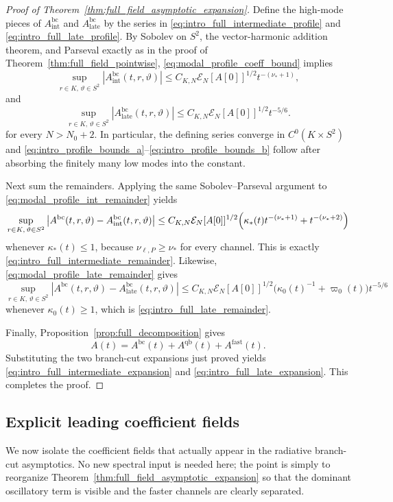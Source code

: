 \documentclass[12pt]{article}
\numberwithin{equation}{section}
\theoremstyle{plain}
\theoremstyle{definition}
\theoremstyle{remark}
\newcommand{\bc}{\mathrm{bc}}
\newcommand{\qb}{\mathrm{qb}}
\newcommand{\fast}{\mathrm{fast}}
\newcommand{\vp}{\varpi}
\newcommand{\kap}{\kappa}
\newcommand{\abs}[1]{\left|#1\right|}
\begin{document}
\begin{proof}[Proof of Theorem~\ref{thm:full_field_asymptotic_expansion}]
Define the high-mode pieces of $A^{\bc}_{\mathrm{int}}$ and $A^{\bc}_{\mathrm{late}}$ by the series in \eqref{eq:intro_full_intermediate_profile} and \eqref{eq:intro_full_late_profile}.  By Sobolev on $S^2$, the vector-harmonic addition theorem, and Parseval exactly as in the proof of Theorem~\ref{thm:full_field_pointwise}, \eqref{eq:modal_profile_coeff_bound} implies
\[
   \sup_{r\in K,\,\vartheta\in S^2}
   \abs{A^{\bc}_{\mathrm{int}}(t,r,\vartheta)}
   \le
   C_{K,N}\mathcal E_N[A[0]]^{1/2}t^{-(\nu_*+1)},
\]
and
\[
   \sup_{r\in K,\,\vartheta\in S^2}
   \abs{A^{\bc}_{\mathrm{late}}(t,r,\vartheta)}
   \le
   C_{K,N}\mathcal E_N[A[0]]^{1/2}t^{-5/6}.
\]
for every $N>N_0+2$.  In particular, the defining series converge in $C^0(K\times S^2)$ and \eqref{eq:intro_profile_bounds_a}--\eqref{eq:intro_profile_bounds_b} follow after absorbing the finitely many low modes into the constant.

Next sum the remainders.  Applying the same Sobolev--Parseval argument to \eqref{eq:modal_profile_int_remainder} yields
\[
   \sup_{r\in K,\,\vartheta\in S^2}
   \abs{A^{\bc}(t,r,\vartheta)-A^{\bc}_{\mathrm{int}}(t,r,\vartheta)}
   \le
   C_{K,N}\mathcal E_N[A[0]]^{1/2}
   \Bigl(
      \kap_*(t)t^{-(\nu_*+1)}
      +
      t^{-(\nu_*+2)}
   \Bigr)
\]
whenever $\kap_*(t)\le1$, because $\nu_{\ell,P}\ge\nu_*$ for every channel.  This is exactly \eqref{eq:intro_full_intermediate_remainder}.  Likewise, \eqref{eq:modal_profile_late_remainder} gives
\[
   \sup_{r\in K,\,\vartheta\in S^2}
   \abs{A^{\bc}(t,r,\vartheta)-A^{\bc}_{\mathrm{late}}(t,r,\vartheta)}
   \le
   C_{K,N}\mathcal E_N[A[0]]^{1/2}
   \bigl(\kap_0(t)^{-1}+\vp_0(t)\bigr)t^{-5/6}
\]
whenever $\kap_0(t)\ge1$, which is \eqref{eq:intro_full_late_remainder}.

Finally, Proposition~\ref{prop:full_decomposition} gives
\[
   A(t)=A^{\bc}(t)+A^{\qb}(t)+A^{\fast}(t).
\]
Substituting the two branch-cut expansions just proved yields \eqref{eq:intro_full_intermediate_expansion} and \eqref{eq:intro_full_late_expansion}.  This completes the proof.
\end{proof}


\subsection{Explicit leading coefficient fields}

We now isolate the coefficient fields that actually appear in the radiative branch-cut asymptotics.  No new spectral input is needed here; the point is simply to reorganize Theorem~\ref{thm:full_field_asymptotic_expansion} so that the dominant oscillatory term is visible and the faster channels are clearly separated.
\end{document}
